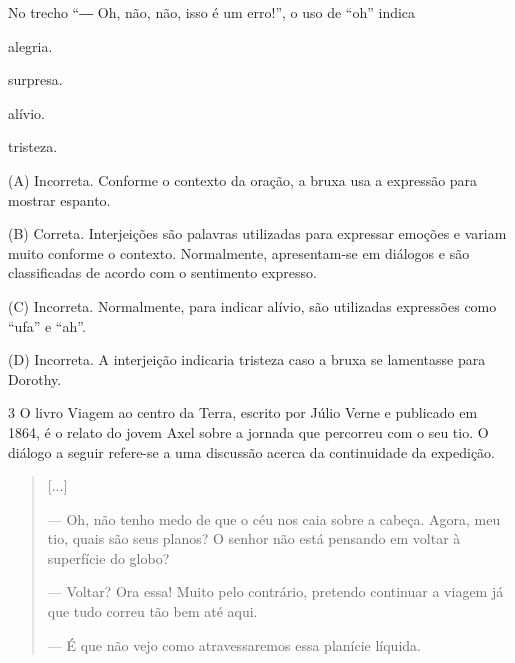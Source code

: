 \begin{escolha}
\begin{escolha}
{\begin{escolha}

No trecho ``― Oh, não, não, isso é um erro!'', o uso de ``oh'' indica

\begin{escolha}
\item alegria.

\item surpresa.

\item alívio.

\item tristeza.
\end{escolha}


(A) Incorreta. Conforme o contexto da oração, a bruxa usa a expressão
para mostrar espanto.

(B) Correta. Interjeições são palavras utilizadas para expressar emoções
e variam muito conforme o contexto. Normalmente, apresentam-se em
diálogos e são classificadas de acordo com o sentimento expresso.

(C) Incorreta. Normalmente, para indicar alívio, são utilizadas
expressões como ``ufa'' e ``ah''.

(D) Incorreta. A interjeição indicaria tristeza caso a bruxa se
lamentasse para Dorothy.

\num{3} O livro Viagem ao centro da Terra, escrito por Júlio Verne e
publicado em 1864, é o relato do jovem Axel sobre a jornada que
percorreu com o seu tio. O diálogo a seguir refere-se a uma discussão
acerca da continuidade da expedição.

\begin{quote}
{[}...{]}

--- Oh, não tenho medo de que o céu nos caia sobre a cabeça. Agora, meu
tio, quais são seus planos? O senhor não está pensando em voltar à
superfície do globo?

--- Voltar? Ora essa! Muito pelo contrário, pretendo continuar a viagem
já que tudo correu tão bem até aqui.

--- É que não vejo como atravessaremos essa planície líquida.


\end{quote}
\end{escolha}}
\end{escolha}
\end{escolha}
